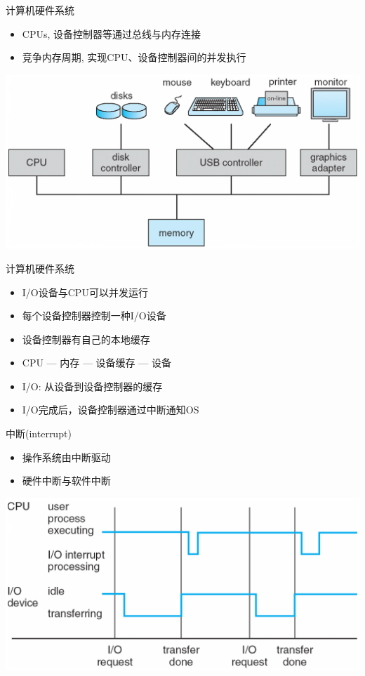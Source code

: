 \documentclass[xcolor=svgnames]{beamer}
\begin{document}
\begin{CJK*}{UTF8}{gbsn}
\begin{frame}{计算机硬件系统}
\begin{itemize}
\item CPUs, 设备控制器等通过总线与内存连接
\item 竞争内存周期, 实现CPU、设备控制器间的并发执行
\end{itemize}
\includegraphics[width=1.0\textwidth]{org.png}
\end{frame}

\begin{frame}{计算机硬件系统}
\begin{itemize}
\item I/O设备与CPU可以并发运行
\item 每个设备控制器控制一种I/O设备
\item 设备控制器有自己的本地缓存
\item CPU --- 内存 --- 设备缓存 --- 设备
\item I/O: 从设备到设备控制器的缓存
\item I/O完成后，设备控制器通过\alert{中断}通知OS
\end{itemize}
\end{frame}

\begin{frame}{中断(interrupt)}
\begin{itemize}
\item 操作系统由中断驱动
\item 硬件中断与软件中断
\end{itemize}
\includegraphics[width=1.0\textwidth]{interrupt.png}
\end{frame}


\end{CJK*}
\end{document}
